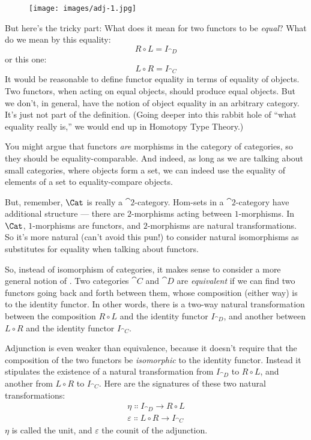 \begin{figure}[H]
  \centering
  \texttt{[image: images/adj-1.jpg]}
\end{figure}

\noindent
But here's the tricky part: What does it mean for two functors to be
\emph{equal}? What do we mean by this equality:
\[R \circ L = I_{\cat{D}}\]
or this one:
\[L \circ R = I_{\cat{C}}\]
It would be reasonable to define functor equality in terms of equality
of objects. Two functors, when acting on equal objects, should produce
equal objects. But we don't, in general, have the notion of object
equality in an arbitrary category. It's just not part of the definition.
(Going deeper into this rabbit hole of ``what equality really is,'' we
would end up in Homotopy Type Theory.)

You might argue that functors \emph{are} morphisms in the category of
categories, so they should be equality-comparable. And indeed, as long
as we are talking about small categories, where objects form a set, we
can indeed use the equality of elements of a set to equality-compare
objects.

But, remember, $\Cat$ is really a $\cat{2}$-category. Hom-sets in a
$\cat{2}$-category have additional structure --- there are $2$-morphisms acting
between $1$-morphisms. In $\Cat$, $1$-morphisms are functors, and
$2$-morphisms are natural transformations. So it's more natural (can't
avoid this pun!) to consider natural isomorphisms as substitutes for
equality when talking about functors.

So, instead of isomorphism of categories, it makes sense to consider a
more general notion of . Two categories $\cat{C}$ and
$\cat{D}$ are \emph{equivalent} if we can find two functors going back
and forth between them, whose composition (either way) is
 to the identity functor. In other words,
there is a two-way natural transformation between the composition
$R \circ L$ and the identity functor $I_{\cat{D}}$, and another
between $L \circ R$ and the identity functor $I_{\cat{C}}$.

Adjunction is even weaker than equivalence, because it doesn't require
that the composition of the two functors be \emph{isomorphic} to the
identity functor. Instead it stipulates the existence of a  natural transformation from $I_{\cat{D}}$ to $R \circ L$, and
another from $L \circ R$ to $I_{\cat{C}}$. Here are the signatures of
these two natural transformations:
\begin{gather*}
  \eta \Colon I_{\cat{D}} \to R \circ L \\
  \varepsilon \Colon L \circ R \to I_{\cat{C}}
\end{gather*}
$\eta$ is called the unit, and $\varepsilon$ the counit of the adjunction.

